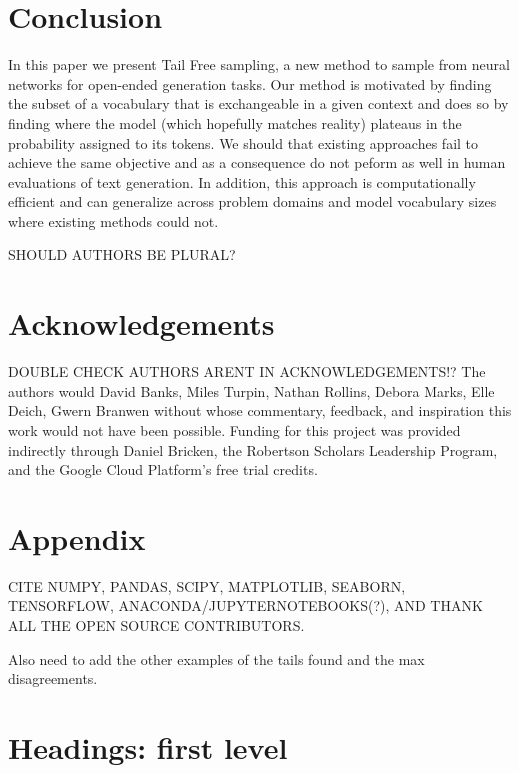 \documentclass{article}
\begin{document}
\section{Conclusion}

In this paper we present Tail Free sampling, a new method to sample from neural networks for open-ended generation tasks. Our method is motivated by finding the subset of a vocabulary that is exchangeable in a given context and does so by finding where the model (which hopefully matches reality) plateaus in the probability assigned to its tokens. We should that existing approaches fail to achieve the same objective and as a consequence do not peform as well in human evaluations of text generation. In addition, this approach is computationally efficient and can generalize across problem domains and model vocabulary sizes where existing methods could not.

SHOULD AUTHORS BE PLURAL?
\section*{Acknowledgements} 
DOUBLE CHECK AUTHORS ARENT IN ACKNOWLEDGEMENTS!?
The authors would David Banks, Miles Turpin, Nathan Rollins, Debora Marks, Elle Deich, Gwern Branwen without whose commentary, feedback, and inspiration this work would not have been possible. Funding for this project was provided indirectly through Daniel Bricken, the Robertson Scholars Leadership Program, and the Google Cloud Platform's free trial credits.



%  

\section*{Appendix}

CITE NUMPY, PANDAS, SCIPY, MATPLOTLIB, SEABORN, TENSORFLOW, ANACONDA/JUPYTERNOTEBOOKS(?), AND THANK ALL THE OPEN SOURCE CONTRIBUTORS. 

Also need to add the other examples of the tails found and the max disagreements. 

\section{Headings: first level}
\label{sec:headings}
\end{document}
